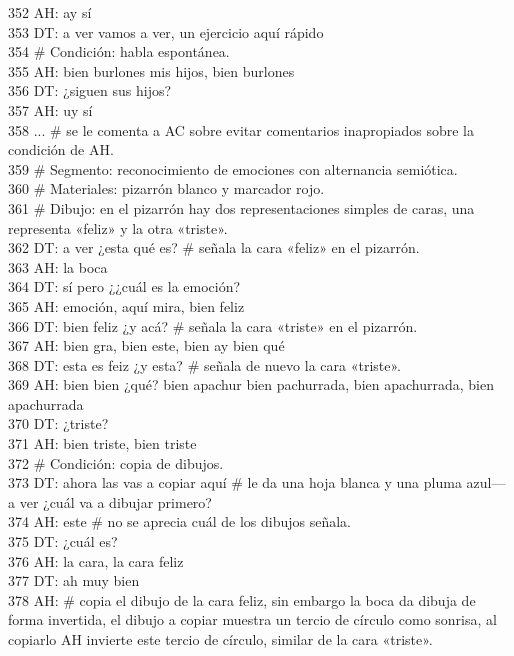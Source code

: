 352 AH: ay sí\\
353 DT: a ver vamos a ver, un ejercicio aquí rápido\\
354 \# Condición: habla espontánea.\\
355 AH: bien burlones mis hijos, bien burlones\\
356 DT: ¿siguen sus hijos?\\
357 AH: uy sí\\
358 ... \# se le comenta a AC sobre evitar comentarios inapropiados sobre la condición de AH.\\
359 \# Segmento: reconocimiento de emociones con alternancia semiótica.\\
360 \# Materiales: pizarrón blanco y marcador rojo.\\
361 \# Dibujo: en el pizarrón hay dos representaciones simples de caras, una representa «feliz» y la otra «triste».\\
362 DT: a ver ¿esta qué es? \# señala la cara «feliz» en el pizarrón.\\
363 AH: la boca\\
364 DT: sí pero ¿¿cuál es la emoción?\\
365 AH: emoción, aquí mira, bien feliz\\
366 DT: bien feliz ¿y acá? \# señala la cara «triste» en el pizarrón.\\
367 AH: bien gra, bien este, bien ay bien qué\\
368 DT: esta es feiz ¿y esta? \# señala de nuevo la cara «triste».\\
369 AH: bien bien ¿qué? bien apachur bien pachurrada, bien apachurrada, bien apachurrada\\
370 DT: ¿triste?\\
371 AH: bien triste, bien triste\\
372 \# Condición: copia de dibujos.\\
373 DT: ahora las vas a copiar aquí \# le da una hoja blanca y una pluma azul--- a ver ¿cuál va a dibujar primero?\\
374 AH: este \# no se aprecia cuál de los dibujos señala.\\
375 DT: ¿cuál es?\\
376 AH: la cara, la cara feliz\\
377 DT: ah muy bien\\
378 AH: \# copia el dibujo de la cara feliz, sin embargo la boca da dibuja de forma invertida, el dibujo a copiar muestra un tercio de círculo como sonrisa, al copiarlo AH invierte este tercio de círculo, similar de la cara «triste».\\
